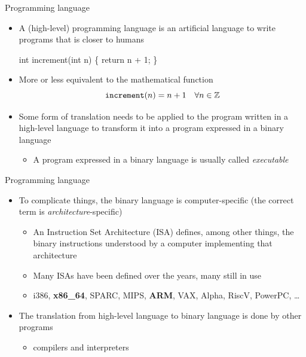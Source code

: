 \begin{frame}[fragile]{Programming language}
  \begin{itemize}
  \item<1-> A (high-level) programming language is an artificial language to write
    programs that is closer to humans
    \begin{codeblock}
int increment(int n)
\{
  return n + 1;
\}\end{codeblock}        
  \item<1-> More or less equivalent to the mathematical function
  \[
    \verb|increment|(n) = n + 1 \quad \forall n \in \mathbb{Z}
  \]

  \item<2-> Some form of translation needs to be applied to the program written in a
    high-level language to transform it into a program expressed in a binary
    language
    \begin{itemize}
    \item A program expressed in a binary language is usually called \textit{executable}
    \end{itemize}
  \end{itemize}

\end{frame}
\begin{frame}[fragile]{Programming language \insertcontinuationtext}
  \begin{itemize}
  \item<1-> To complicate things, the binary language is computer-specific (the
    correct term is \textit{architecture}-specific)
    \begin{itemize}[<.->]
    \item An Instruction Set Architecture (ISA) defines, among other things, the
      binary instructions understood by a computer implementing that
      architecture
    \item Many ISAs have been defined over the years, many still in use
    \item i386, \textbf{x86_64}, SPARC, MIPS, \textbf{ARM}, VAX, Alpha, RiscV,
      PowerPC, \ldots
    \end{itemize}
  \item<2-> The translation from high-level language to binary language is done
    by other programs
    \begin{itemize}[<.->]
    \item \alert{compilers} and interpreters
    \end{itemize}
  \end{itemize}

\end{frame}


